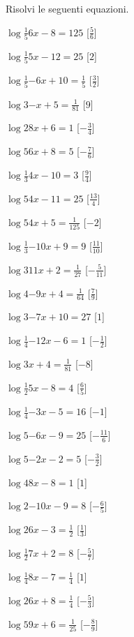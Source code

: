 \begin{esercizio}\label{ese:}
 Risolvi le seguenti equazioni.
\begin{multicols}{2}
 \begin{enumeratea}
  \item  \(\log{\frac{1}{5}}{6 x -8} = 125\)
   \hfill [\( \frac{5}{6} \)]
  \item  \(\log{\frac{1}{5}}{5 x -12} = 25\)
   \hfill [\( 2 \)]
  \item  \(\log{\frac{1}{5}}{-6 x +10} = \frac{1}{5}\)
   \hfill [\( \frac{3}{2} \)]
  \item  \(\log{3}{- x +5} = \frac{1}{81}\)
   \hfill [\( 9 \)]
  \item  \(\log{2}{8 x +6} = 1\)
   \hfill [\( -\frac{3}{4} \)]
  \item  \(\log{5}{6 x +8} = 5\)
   \hfill [\( -\frac{7}{6} \)]
  \item  \(\log{\frac{1}{3}}{4 x -10} = 3\)
   \hfill [\( \frac{9}{4} \)]
  \item  \(\log{5}{4 x -11} = 25\)
   \hfill [\( \frac{13}{4} \)]
  \item  \(\log{5}{4 x +5} = \frac{1}{125}\)
   \hfill [\( -2 \)]
  \item  \(\log{\frac{1}{3}}{-10 x +9} = 9\)
   \hfill [\( \frac{11}{10} \)]
  \item  \(\log{3}{11 x +2} = \frac{1}{27}\)
   \hfill [\( -\frac{5}{11} \)]
  \item  \(\log{4}{-9 x +4} = \frac{1}{64}\)
   \hfill [\( \frac{7}{9} \)]
  \item  \(\log{3}{-7 x +10} = 27\)
   \hfill [\( 1 \)]
  \item  \(\log{\frac{1}{4}}{-12 x -6} = 1\)
   \hfill [\( -\frac{1}{2} \)]
  \item  \(\log{3}{x +4} = \frac{1}{81}\)
   \hfill [\( -8 \)]
  \item  \(\log{\frac{1}{2}}{5 x -8} = 4\)
   \hfill [\( \frac{6}{5} \)]
  \item  \(\log{\frac{1}{4}}{-3 x -5} = 16\)
   \hfill [\( -1 \)]
  \item  \(\log{5}{-6 x -9} = 25\)
   \hfill [\( -\frac{11}{6} \)]
  \item  \(\log{5}{-2 x -2} = 5\)
   \hfill [\( -\frac{3}{2} \)]
  \item  \(\log{4}{8 x -8} = 1\)
   \hfill [\( 1 \)]
  \item  \(\log{2}{-10 x -9} = 8\)
   \hfill [\( -\frac{6}{5} \)]
  \item  \(\log{2}{6 x -3} = \frac{1}{2}\)
   \hfill [\( \frac{1}{3} \)]
  \item  \(\log{\frac{1}{2}}{7 x +2} = 8\)
   \hfill [\( -\frac{5}{7} \)]
  \item  \(\log{\frac{1}{4}}{8 x -7} = \frac{1}{4}\)
   \hfill [\( 1 \)]
  \item  \(\log{2}{6 x +8} = \frac{1}{4}\)
   \hfill [\( -\frac{5}{3} \)]
  \item  \(\log{5}{9 x +6} = \frac{1}{25}\)
   \hfill [\( -\frac{8}{9} \)]
 \end{enumeratea}
\end{multicols}
\end{esercizio}



